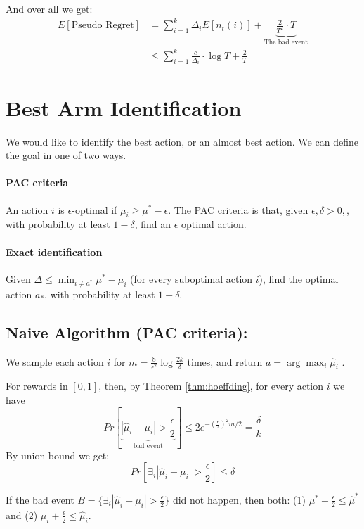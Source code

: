 And over all we get:
\begin{align*}
E\left[\text{Pseudo Regret}\right] & =
\sum_{i=1}^{k}\Delta_{i}E\left[n_{t}(i)\right]+\underbrace{\frac{2}{T^{2}}\cdot
T}_{\text{The bad event}}
\\
 & \le  \sum_{i=1}^{k}\frac{c}{\Delta_{i}}\cdot\log T+\frac{2}{T}
\end{align*}

\section{Best Arm Identification}

We would like to identify the best action, or an almost best action.
We can define the goal in one of two ways.

\paragraph{PAC criteria }
An action $i$ is $\epsilon$-optimal if  $\mu_i\geq \mu^*-\epsilon$. The PAC criteria is
that, given $\epsilon,\delta>0,$, with probability at least
$1-\delta$, find an $\epsilon$ optimal action.

\paragraph{Exact identification}
Given $\Delta\le\min_{i\neq a^*}\mu^{*}-\mu_{i}$ (for every suboptimal action $i$),
find the optimal action $a_{*}$, with probability at least
$1-\delta$.

\subsection{Naive Algorithm (PAC criteria):}

We sample each action $i$ for
$m=\frac{8}{\epsilon^{2}}\log\frac{2k}{\delta}$ times, and return
$a= \arg\max_{i}\hat{\mu}_{i}$ .

For rewards in $[ 0 ,1]$, then, by Theorem \ref{thm:hoeffding}, for
every action $i$ we have
\[
Pr\left[\underbrace{\left|\hat{\mu}_{i}-\mu_{i}\right|>\frac{\epsilon}{2}}_{\text{bad
event}}\right]\le 2
e^{-\left(\frac{\epsilon}{2}\right)^{2}m/2}=\frac{\delta}{k}
\]
By union bound we get:
\[
Pr\left[\exists_{i}\left|\hat{\mu}_{i}-\mu_{i}\right|>\frac{\epsilon}{2}\right]\le\delta
\]

If the bad event
$B=\{\exists_{i}\left|\hat{\mu}_{i}-\mu_{i}\right|>\frac{\epsilon}{2}\}$
did not happen, then both: (1)
$\mu^{*}-\frac{\epsilon}{2}\le\hat{\mu}^{*}$ and (2)
$\mu_{i}+\frac{\epsilon}{2}\le\hat{\mu}_{i}$.

